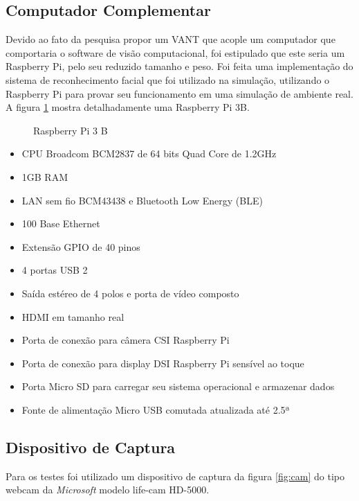 \subsection{Computador Complementar}
\label{subsec:compcomp}

Devido ao fato da pesquisa propor um VANT que acople um computador que comportaria o software de visão computacional, foi estipulado que este seria um Raspberry Pi, pelo seu reduzido tamanho e peso. Foi feita uma implementação do sistema de reconhecimento facial que foi utilizado na simulação, utilizando o Raspberry Pi para provar seu funcionamento em uma simulação de ambiente real. A figura \ref{fig:gpiorasp} mostra detalhadamente uma Raspberry Pi 3B.

\begin{figure}[H]
	\centering	
	\caption{Raspberry Pi 3 B}
	\def\svgwidth{15cm}
	
	\label{fig:gpiorasp}
\end{figure}

\begin{itemize}
	\item CPU Broadcom BCM2837 de 64 bits Quad Core de 1.2GHz
	\item 1GB RAM
	\item LAN sem fio BCM43438 e Bluetooth Low Energy (BLE)
	\item 100 Base Ethernet
	\item Extensão GPIO de 40 pinos
	\item 4 portas USB 2
	\item Saída estéreo de 4 polos e porta de vídeo composto
	\item HDMI em tamanho real
	\item Porta de conexão para câmera CSI Raspberry Pi
	\item Porta de conexão para display DSI Raspberry Pi sensível ao toque
	\item Porta Micro SD para carregar seu sistema operacional e armazenar dados
	\item Fonte de alimentação Micro USB comutada atualizada até 2.5ª
\end{itemize}

\subsection{Dispositivo de Captura}

Para os testes foi utilizado um dispositivo de captura da figura \ref{fig:cam} do tipo webcam da \textit{Microsoft} modelo life-cam HD-5000.

